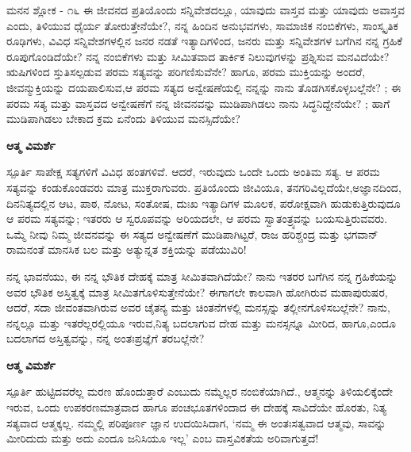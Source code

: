 \newpage
\begin{mananam}{\mananamfont ಮನನ ಶ್ಲೋಕ - ೧೬}
\footnotesize \mananamtext ಈ ಜೀವನದ ಪ್ರತಿಯೊಂದು ಸನ್ನಿವೇಶದಲ್ಲೂ, ಯಾವುದು ವಾಸ್ತವ ಮತ್ತು ಯಾವುದು ಅವಾಸ್ತವ ಎಂದು, ತಿಳಿಯುವ ಧೈರ್ಯ ತೋರುತ್ತೇನೆಯೇ?, ನನ್ನ ಹಿಂದಿನ ಅನುಭವಗಳು, ಸಾಮಾಜಿಕ ನಂಬಿಕೆಗಳು, ಸಾಂಸ್ಕೃತಿಕ ರೂಢಿಗಳು, ವಿವಿಧ ಸನ್ನಿವೇಶಗಳಲ್ಲಿನ ಜನರ ನಡತೆ ಇತ್ಯಾದಿಗಳಿಂದ, ಜನರು ಮತ್ತು ಸನ್ನಿವೇಶಗಳ ಬಗೆಗಿನ ನನ್ನ ಗ್ರಹಿಕೆ ರೂಪುಗೊಂಡಿದೆಯೇ? ನನ್ನ ನಂಬಿಕೆಗಳು ಮತ್ತು ಸೀಮಿತವಾದ ತಾರ್ಕಿಕ ನಿಲುವುಗಳನ್ನು ಪ್ರಶ್ನಿಸುವ ಮನವಿದೆಯೇ? ಋಷಿಗಳಿಂದ ಸ್ತುತಿಸಲ್ಪಡುವ ಪರಮ ಸತ್ಯವನ್ನು ಪರಿಗಣಿಸುವೆನೇ? ಹಾಗೂ, ಪರಮ ಮುಕ್ತಿಯನ್ನು ಅಂದರೆ, ಜೀವನ್ಮುಕ್ತಿಯನ್ನು ದಯಪಾಲಿಸುವ,ಆ ಪರಮ ಸತ್ಯದ ಅನ್ವೇಷಣೆಯಲ್ಲಿ ನನ್ನನ್ನು ನಾನು ತೊಡಗಿಸಕೊಳ್ಳಬಲ್ಲೆನೇ? ; ಈ ಪರಮ ಸತ್ಯ ಮತ್ತು ವಾಸ್ತವದ ಅನ್ವೇಷಣೆಗೆ ನನ್ನ ಜೀವನವನ್ನು ಮುಡಿಪಾಗಿಡಲು ನಾನು ಸಿದ್ಧನಿದ್ದೇನೆಯೇ? ; ಹಾಗೆ ಮುಡಿಪಾಗಿಡಲು ಬೇಕಾದ ಕ್ರಮ ಏನೆಂದು ತಿಳಿಯುವ ಮನಸ್ಸಿದೆಯೇ?
\end{mananam}
\WritingHand\enspace\textbf{ಆತ್ಮ ವಿಮರ್ಶೆ}
\begin{inspiration}{\mananamfont ಸ್ಪೂರ್ತಿ}
\footnotesize \mananamtext ಸಾಪೇಕ್ಷ ಸತ್ಯಗಳಿಗೆ ವಿವಿಧ ಹಂತಗಳಿವೆ. ಆದರೆ, ಇರುವುದು ಒಂದೇ ಒಂದು ಅಂತಿಮ ಸತ್ಯ. ಆ ಪರಮ ಸತ್ಯವನ್ನು ಕಂಡುಕೊಂಡವರು ಮಾತ್ರ ಮುಕ್ತರಾಗುವರು. ಪ್ರತಿಯೊಂದು ಜೀವಿಯೂ, ತನಗರಿವಿಲ್ಲದೆಯೇ,ಅಜ್ಞಾನದಿಂದ, ದಿನನಿತ್ಯದಲ್ಲಿನ ಆಟ, ಪಾಠ, ನೋಟ, ಸಂತೋಷ, ದುಃಖ ಇತ್ಯಾದಿಗಳ ಮೂಲಕ, ಪರೋಕ್ಷವಾಗಿ ಹುಡುಕುತ್ತಿರುವುದೂ ಆ ಪರಮ ಸತ್ಯವನ್ನು; ಇತರರು ಆ ಸ್ವರೂಪವನ್ನು ಅರಿಯದಲೇ, ಆ ಪರಮ ಸ್ವಾತಂತ್ರ್ಯವನ್ನು ಬಯಸುತ್ತಿರುವವರು. ಒಮ್ಮೆ ನೀವು ನಿಮ್ಮ ಜೀವನವನ್ನು ಈ ಸತ್ಯದ ಅನ್ವೇಷಣೆಗೆ ಮುಡಿಪಾಗಿಟ್ಟರೆ, ರಾಜ ಹರಿಶ್ಚಂದ್ರ ಮತ್ತು ಭಗವಾನ್ ರಾಮನಂತೆ ಮಾನಸಿಕ ಬಲ ಮತ್ತು ಅತ್ಯುನ್ನತ ಶಕ್ತಿಯನ್ನು ಪಡೆಯುವಿರಿ!
\end{inspiration}

\newpage
\begin{mananam}{}
\footnotesize \mananamtext ನನ್ನ ಭಾವನೆಯು, ಈ ನನ್ನ ಭೌತಿಕ ದೇಹಕ್ಕೆ ಮಾತ್ರ ಸೀಮಿತವಾಗಿದೆಯೇ? ನಾನು ಇತರರ ಬಗೆಗಿನ ನನ್ನ ಗ್ರಹಿಕೆಯನ್ನು ಅವರ ಭೌತಿಕ ಅಸ್ತಿತ್ವಕ್ಕೆ ಮಾತ್ರ ಸೀಮಿತಗೊಳಿಸುತ್ತೇನೆಯೇ? ಈಗಾಗಲೇ ಕಾಲವಾಗಿ ಹೋಗಿರುವ ಮಹಾಪುರುಷರ, ಆದರೆ, ಸದಾ ಜೀವಂತವಾಗಿರುವ ಅವರ ಚೈತನ್ಯ ಮತ್ತು ಚಿಂತನೆಗಳಲ್ಲಿ ಮನಸ್ಸನ್ನು ತಲ್ಲೀನಗೊಳಿಸಬಲ್ಲೆನೇ? ನಾನು, ನನ್ನಲ್ಲೂ ಮತ್ತು ಇತರೆಲ್ಲರಲ್ಲಿಯೂ ಇರುವ,ನಿತ್ಯ ಬದಲಾಗುವ ದೇಹ ಮತ್ತು ಮನಸ್ಸನ್ನೂ ಮೀರಿದ, ಹಾಗೂ,ಎಂದೂ ಬದಲಾಗದ ಅಸ್ತಿತ್ವವನ್ನು, ನನ್ನ ಅಂತಃಪ್ರಜ್ಞೆಗೆ ತರಬಲ್ಲೆನೇ?
\end{mananam}
\WritingHand\enspace\textbf{ಆತ್ಮ ವಿಮರ್ಶೆ}
\begin{inspiration}{\mananamfont ಸ್ಪೂರ್ತಿ}
\footnotesize \mananamtext ಹುಟ್ಟಿದವರೆಲ್ಲ ಮರಣ ಹೊಂದುತ್ತಾರೆ ಎಂಬುದು ನಮ್ಮೆಲ್ಲರ ನಂಬಿಕೆಯಾಗಿದೆ., ಆತ್ಮನನ್ನು ತಿಳಿಯಲಿಕ್ಕೆಂದೇ ಇರುವ, ಒಂದು ಉಪಕರಣಮಾತ್ರವಾದ ಹಾಗೂ ಪಂಚಭೂತಗಳಿಂದಾದ ಈ ದೇಹಕ್ಕೆ ಸಾವಿದೆಯೇ ಹೊರತು, ನಿತ್ಯ ಸತ್ಯವಾದ ಆತ್ಮಕ್ಕಲ್ಲ. ನಮ್ಮಲ್ಲಿ ಪರಿಪೂರ್ಣ ಜ್ಞಾನ ಉದಯಿಸಿದಾಗ, ‘ನಮ್ಮ ಈ ಅಂತಃಸತ್ವವಾದ ಆತ್ಮವು, ಸಾವನ್ನು ಮೀರಿದುದು ಮತ್ತು ಅದು ಎಂದೂ ಜನಿಸಿಯೂ ಇಲ್ಲ’ ಎಂಬ ವಾಸ್ತವಿಕತೆಯ ಅರಿವಾಗುತ್ತದೆ!
\end{inspiration}
\newpage



